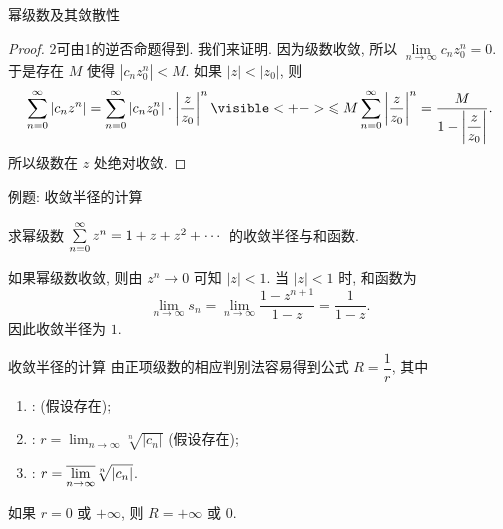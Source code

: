 \begin{frame}{幂级数及其敛散性}
\begin{center}
\end{center}
\onslide<+->
\begin{proof}
\enumnum2可由\enumnum1的逆否命题得到.
\onslide<+->
我们来证明. 因为级数收敛, 所以 $\lim\limits_{n\to\infty}c_n z_0^n=0$.
\onslide<+->
于是存在 $M$ 使得 $|c_nz_0^n|<M$.
\onslide<+->
如果 $|z|<|z_0|$, 则
\[\sum_{n=0}^\infty|c_nz^n|=\sum_{n=0}^\infty|c_nz_0^n|\cdot\abs{\frac z{z_0}}^n
\visible<+->{\le M\sum_{n=0}^\infty\abs{\frac z{z_0}}^n
=\frac{M}{1-\abs{\dfrac z{z_0}}}.}\]
\onslide<+->
所以级数在 $z$ 处绝对收敛.
\end{proof}
\end{frame}


\begin{frame}{例题: 收敛半径的计算}
\begin{example}
求幂级数 $\sum\limits_{n=0}^\infty z^n=1+z+z^2+\cdots$ 的收敛半径与和函数.
\end{example}
\begin{solution}
如果幂级数收敛, 则由 $z^n\to0$ 可知 $|z|<1$.
\onslide<+->
当 $|z|<1$ 时, 和函数为
\[\lim_{n\to\infty}s_n=\lim_{n\to\infty}\frac{1-z^{n+1}}{1-z}=\frac1{1-z}.\]
\onslide<+->
因此收敛半径为 $1$.
\end{solution}
\end{frame}


\begin{frame}{收敛半径的计算}
\onslide<+->
由正项级数的相应判别法容易得到公式 $R=\dfrac1r$, 其中
\begin{enumerate}
\item {}:  (假设存在);
\item {}: $r=\displaystyle\lim_{n\to\infty}\sqrt[n]{|c_n|}$ (假设存在);
\item {}: $r=\displaystyle\overline{\lim_{n\to\infty}} \sqrt[n]{|c_n|}$.
\end{enumerate}
\onslide<+->
如果 $r=0$ 或 $+\infty$, 则 $R=+\infty$ 或 $0$.
\end{frame}


